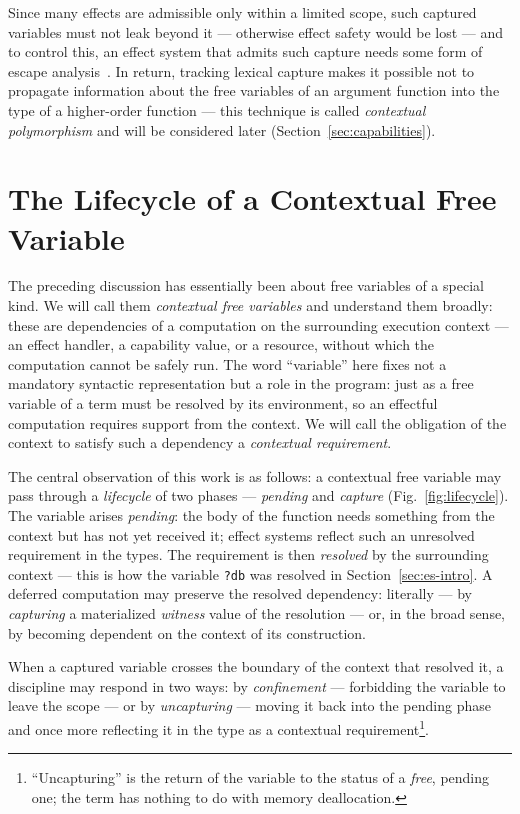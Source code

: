 \documentclass[11pt]{article}
\begin{document}
Since many effects are admissible only within a limited scope, such captured variables
must not leak beyond it --- otherwise effect safety would be lost --- and to control
this, an effect system that admits such capture needs some form of escape
analysis~\cite{park1992escape, hannan1998type}. In return, tracking lexical capture makes
it possible not to propagate information about the free variables of an argument function
into the type of a higher-order function --- this technique is called \emph{contextual
polymorphism} and will be considered later (Section~\ref{sec:capabilities}).


\section{The Lifecycle of a Contextual Free Variable}
\label{sec:idea}

The preceding discussion has essentially been about free variables of a special kind.
We will call them \emph{contextual free variables} and understand them broadly: these are
dependencies of a computation on the surrounding execution context
--- an effect handler, a capability value, or a resource, without
which the computation cannot be safely run. The word \enquote{variable} here fixes
not a mandatory syntactic representation but a role in the program: just as a free variable
of a term must be resolved by its environment, so an effectful computation requires support from
the context. We will call the obligation of the context to satisfy such a dependency a
\emph{contextual requirement}.

The central observation of this work is as follows: a contextual free variable may pass through a
\emph{lifecycle} of two phases --- \emph{pending} and \emph{capture}
(Fig.~\ref{fig:lifecycle}). The variable arises \emph{pending}: the body of the function
needs something from the context but has not yet received it; effect systems reflect
such an unresolved requirement in the types. The requirement is then
\emph{resolved} by the surrounding context --- this is how the variable
\lstinline|?db| was resolved in Section~\ref{sec:es-intro}. A deferred computation may preserve the resolved dependency:
literally --- by \emph{capturing} a materialized \emph{witness} value of the
resolution --- or, in
the broad sense, by becoming dependent on the context of its construction.

When a captured variable crosses the boundary of the context that resolved it, a
discipline may respond in two ways: by \emph{confinement} --- forbidding the variable to leave the scope --- or by
\emph{uncapturing} --- moving it back into the pending phase and once more reflecting it in the
type as a contextual requirement\footnote{\enquote{Uncapturing} is the return of the variable
to the status of a \emph{free}, pending one; the term has nothing to do with memory deallocation.}.
\end{document}
